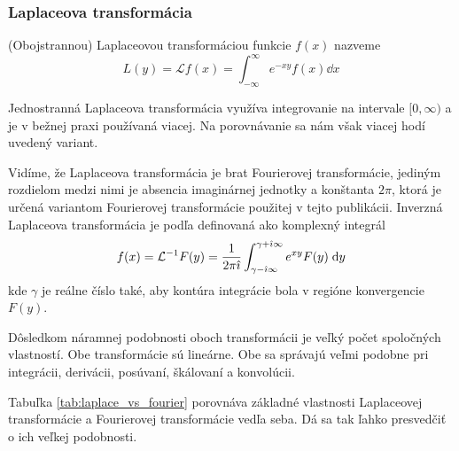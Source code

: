 \subsubsection{Laplaceova transformácia}
\begin{definicia}
(Obojstrannou) Laplaceovou transformáciou funkcie $f(x)$ nazveme
\begin{equation*}
L(y) = \mathcal{L} f(x) = \int_{-\infty}^{\infty} e^{-xy} f(x) \dd x
\end{equation*}
\end{definicia}
\begin{poznamka}
    Jednostranná Laplaceova transformácia využíva integrovanie na
    intervale $[0,\infty)$ a je v bežnej praxi používaná viacej. Na
    porovnávanie sa nám však viacej hodí uvedený variant.
\end{poznamka}
Vidíme, že Laplaceova transformácia je brat Fourierovej transformácie,
jediným rozdielom medzi nimi je absencia imaginárnej jednotky a
konštanta $2\pi$, ktorá je určená variantom Fourierovej transformácie
použitej v tejto publikácii.
Inverzná Laplaceova transformácia je podľa
\cite{wiki:laplace_transform} 
definovaná ako komplexný integrál
\begin{equation*}
    f(x) = \mathcal{L}^{-1} F(y) = \frac{1}{2 \pi \hat{\imath}}
        \int_{\gamma - \hat{\imath} \infty}^{\gamma + \hat{\imath} \infty}
        e^{x y} F(y) \; \mathrm{d} y
\end{equation*}
kde $\gamma$ je reálne číslo také, aby kontúra  integrácie bola v
regióne konvergencie $F(y)$.

Dôsledkom náramnej podobnosti oboch transformácii je veľký počet
spoločných vlastností. Obe transformácie sú lineárne. Obe sa správajú
veľmi podobne pri integrácii, derivácii, posúvaní, škálovaní a
konvolúcii.

Tabuľka \ref{tab:laplace_vs_fourier} porovnáva základné vlastnosti
Laplaceovej transformácie a Fourierovej transformácie vedľa seba. Dá
sa tak ľahko presvedčiť o ich veľkej podobnosti.

